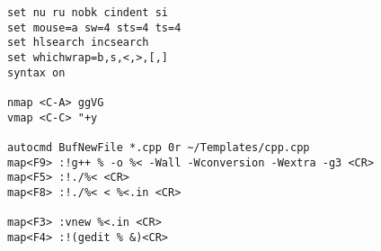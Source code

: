 \begin{lstlisting}
﻿set nu ru nobk cindent si
set mouse=a sw=4 sts=4 ts=4
set hlsearch incsearch
set whichwrap=b,s,<,>,[,]
syntax on

nmap <C-A> ggVG
vmap <C-C> "+y

autocmd BufNewFile *.cpp 0r ~/Templates/cpp.cpp
map<F9> :!g++ % -o %< -Wall -Wconversion -Wextra -g3 <CR>
map<F5> :!./%< <CR>
map<F8> :!./%< < %<.in <CR>

map<F3> :vnew %<.in <CR>
map<F4> :!(gedit % &)<CR>

\end{lstlisting}